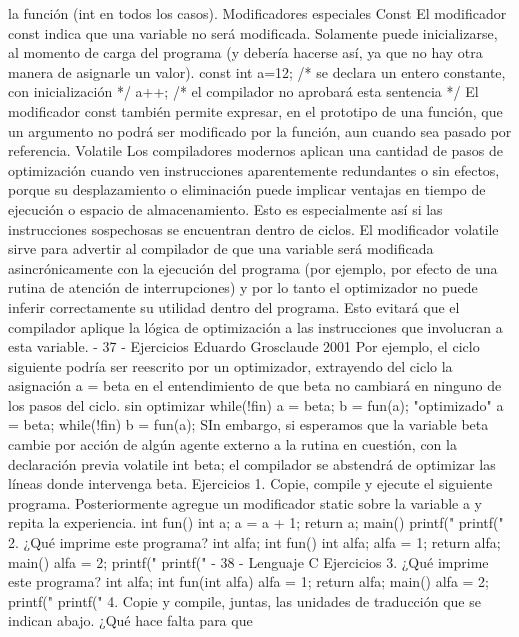 la función (int en todos los casos).
Modificadores especiales
Const
El modificador const indica que una variable no será modificada. Solamente puede inicializarse, al
momento de carga del programa (y debería hacerse así, ya que no hay otra manera de asignarle un
valor).
const int a=12; /* se declara un entero constante, con inicialización */
a++;
/* el compilador no aprobará esta sentencia */
El modificador const también permite expresar, en el prototipo de una función, que un argumento no
podrá ser modificado por la función, aun cuando sea pasado por referencia.
Volatile
Los compiladores modernos aplican una cantidad de pasos de optimización cuando ven instrucciones
aparentemente redundantes o sin efectos, porque su desplazamiento o eliminación puede implicar
ventajas en tiempo de ejecución o espacio de almacenamiento. Esto es especialmente así si las
instrucciones sospechosas se encuentran dentro de ciclos. El modificador volatile sirve para advertir al
compilador de que una variable será modificada asincrónicamente con la ejecución del programa (por
ejemplo, por efecto de una rutina de atención de interrupciones) y por lo tanto el optimizador no puede
inferir correctamente su utilidad dentro del programa. Esto evitará que el compilador aplique la lógica
de optimización a las instrucciones que involucran a esta variable.
- 37 -
Ejercicios
Eduardo Grosclaude 2001
Por ejemplo, el ciclo siguiente podría ser reescrito por un optimizador, extrayendo del ciclo la
asignación a = beta en el entendimiento de que beta no cambiará en ninguno de los pasos del ciclo.
sin optimizar
while(!fin) {
a = beta;
b = fun(a);
}
"optimizado"
a = beta;
while(!fin)
b = fun(a);
SIn embargo, si esperamos que la variable beta cambie por acción de algún agente externo a la rutina
en cuestión, con la declaración previa
volatile int beta;
el compilador se abstendrá de optimizar las líneas donde intervenga beta.
Ejercicios
1. Copie, compile y ejecute el siguiente programa. Posteriormente agregue un modificador static sobre
la variable a y repita la experiencia.
int fun()
{
int a;
a = a + 1;
return a;
}
main()
{
printf("%
printf("%
}
2. ¿Qué imprime este programa?
int alfa;
int fun()
{
int alfa;
alfa = 1;
return alfa;
}
main()
{
alfa = 2;
printf("%
printf("%
}
- 38 -
Lenguaje C
Ejercicios
3. ¿Qué imprime este programa?
int alfa;
int fun(int alfa)
{
alfa = 1;
return alfa;
}
main()
{
alfa = 2;
printf("%
printf("%
}
4. Copie y compile, juntas, las unidades de traducción que se indican abajo. ¿Qué hace falta para que
